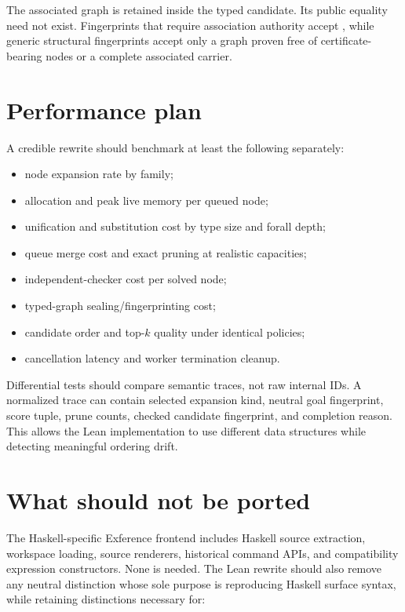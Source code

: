 \documentclass[10pt,letterpaper,oneside]{report}
\newcommand{\code}[1]{\texttt{\detokenize{#1}}}
\begin{document}
The associated graph is retained inside the typed candidate. Its public equality need not exist. Fingerprints that require association authority accept \code{AssociatedGraph}, while generic structural fingerprints accept only a graph proven free of certificate-bearing nodes or a complete associated carrier.

\section{Performance plan}

A credible rewrite should benchmark at least the following separately:

\begin{itemize}
  \item node expansion rate by family;
  \item allocation and peak live memory per queued node;
  \item unification and substitution cost by type size and forall depth;
  \item queue merge cost and exact pruning at realistic capacities;
  \item independent-checker cost per solved node;
  \item typed-graph sealing/fingerprinting cost;
  \item candidate order and top-\(k\) quality under identical policies;
  \item cancellation latency and worker termination cleanup.
\end{itemize}

Differential tests should compare semantic traces, not raw internal IDs. A normalized trace can contain selected expansion kind, neutral goal fingerprint, score tuple, prune counts, checked candidate fingerprint, and completion reason. This allows the Lean implementation to use different data structures while detecting meaningful ordering drift.

\section{What should not be ported}

The Haskell-specific Exference frontend includes Haskell source extraction, workspace loading, source renderers, historical command APIs, and compatibility expression constructors. None is needed. The Lean rewrite should also remove any neutral distinction whose sole purpose is reproducing Haskell surface syntax, while retaining distinctions necessary for:
\end{document}

